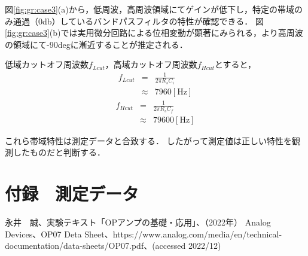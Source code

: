 \documentclass[dvipdfmx,titlepage,a4j]{jsarticle}  %
\begin{document}
図\ref{fig:gr:case3}(a)から，低周波，高周波領域にてゲインが低下し，特定の帯域のみ通過（0db）しているバンドパスフィルタの特性が確認できる．
図\ref{fig:gr:case3}(b)では実用微分回路による位相変動が顕著にみられる，より高周波の領域にて-90degに漸近することが推定される．

低域カットオフ周波数$f_{Lcut}$，高域カットオフ周波数$f_{Hcut}$とすると，
\begin{eqnarray}
  f_{Lcut} &=& \frac{1}{2\pi R_s C_i}\\
  &\approx& 7960 \mathrm{[Hz]}
\end{eqnarray}
\begin{eqnarray}
  f_{Hcut} &=& \frac{1}{2\pi R_s C_f}\\
  &\approx& 79600 \mathrm{[Hz]}
\end{eqnarray}

これら帯域特性は測定データと合致する．
したがって測定値は正しい特性を観測したものだと判断する．

\section{付録　測定データ}

\begin{thebibliography}{99}
   永井　誠、実験テキスト「OPアンプの基礎・応用」、（2022年）
   Analog Devices、OP07 Deta Sheet、https://www.analog.com/media/en/technical-documentation/data-sheets/OP07.pdf、(accessed 2022/12)
\end{thebibliography}
\end{document}
